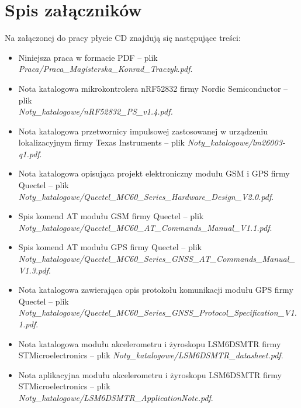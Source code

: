 \chapter*{Spis załączników}

Na załączonej do pracy płycie CD znajdują się następujące treści:
\begin{itemize}
 \item Niniejsza praca w formacie PDF -- plik\\ \textit{Praca/Praca\_Magisterska\_Konrad\_Traczyk.pdf}.
 
 \item Nota katalogowa mikrokontrolera nRF52832 firmy Nordic Semiconductor -- plik\\ \textit{Noty\_katalogowe/nRF52832\_PS\_v1.4.pdf.}
 
 \item Nota katalogowa przetwornicy impulsowej zastosowanej w urządzeniu lokalizacyjnym firmy Texas Instruments -- plik \textit{Noty\_katalogowe/lm26003-q1.pdf}.
 
 \item Nota katalogowa opisująca projekt elektroniczny modułu GSM i GPS firmy Quectel -- plik \textit{Noty\_katalogowe/Quectel\_MC60\_Series\_Hardware\_Design\_V2.0.pdf}.
 
 \item Spis komend AT modułu GSM firmy Quectel -- plik\\ \textit{Noty\_katalogowe/Quectel\_MC60\_AT\_Commands\_Manual\_V1.1.pdf}.
 
 \item Spis komend AT modułu GPS firmy Quectel -- plik\\ \textit{Noty\_katalogowe/Quectel\_MC60\_Series\_GNSS\_AT\_Commands\_Manual\_V1.3.pdf}.
 
 \item Nota katalogowa zawierająca opis protokołu komunikacji modułu GPS firmy Quectel -- plik \textit{Noty\_katalogowe/Quectel\_MC60\_Series\_GNSS\_Protocol\_Specification\_V1.1.pdf}.
  
 \item Nota katalogowa modułu akcelerometru i żyroskopu LSM6DSMTR firmy STMicroelectronics -- plik \textit{Noty\_katalogowe/LSM6DSMTR\_datasheet.pdf}.

  \item Nota aplikacyjna modułu akcelerometru i żyroskopu LSM6DSMTR firmy STMicroelectronics -- plik \textit{Noty\_katalogowe/LSM6DSMTR\_ApplicationNote.pdf}.
 

\end{itemize}
